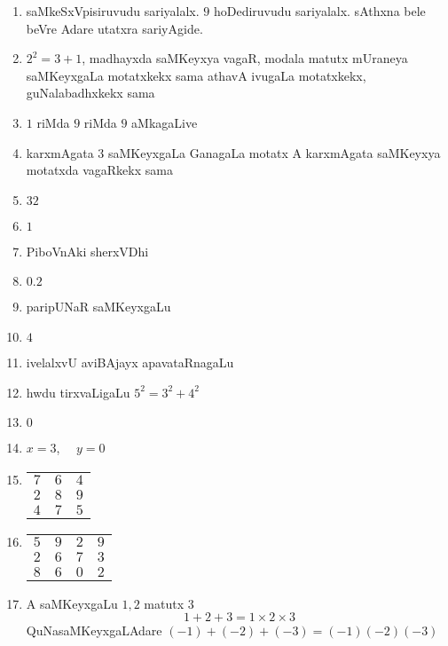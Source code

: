 \begin{enumerate}
\item saMkeSxVpisiruvudu sariyalalx. $9$ hoDediruvudu sariyalalx. sAthxna bele beVre Adare utatxra sariyAgide. 

\item $2^2 =3+1$, madhayxda saMKeyxya vagaR, modala matutx mUraneya saMKeyxgaLa motatxkekx sama athavA ivugaLa motatxkekx, guNalabadhxkekx sama

\item $1$ riMda $9$ riMda $9$ aMkagaLive

\item karxmAgata $3$ saMKeyxgaLa GanagaLa motatx A karxmAgata saMKeyxya motatxda vagaRkekx sama

\item $32$
  
\item $1$

\item PiboVnAki sherxVDhi

\item $0.2$

\item paripUNaR saMKeyxgaLu

\item $4$

\item ivelalxvU aviBAjayx apavataRnagaLu

\item hwdu tirxvaLigaLu $5^2 = 3^2+4^2$

\item $0$

\item $x =3$, ~~$y=0$

\item
  \begin{tabular}[t]{ccc}
    $7$&$6$&$4$\\
    $2$&$8$&$9$\\\cline{1-3}
    $4$&$7$&$5$
  \end{tabular}
  
\item
  \begin{tabular}[t]{cccc}
    $5$&$9$&$2$&$9$\\
    $2$&$6$&$7$&$3$\\\cline{1-4}
    $8$&$6$&$0$&$2$
  \end{tabular}

\item A saMKeyxgaLu $1, 2$ matutx $3$
  $$
1+2+3= 1\times 2 \times 3
$$
QuNasaMKeyxgaLAdare $(-1) + (-2) + (-3) = (-1) (-2) (-3)$


\end{enumerate}
